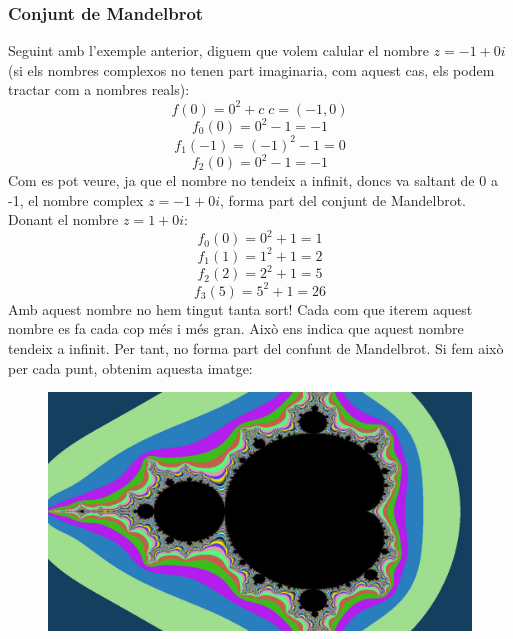 \subsubsection{Conjunt de Mandelbrot}
Seguint amb l'exemple anterior, diguem que volem calular el nombre $z = -1 + 0i$ (si els nombres complexos no tenen part imaginaria, com aquest cas, els podem tractar com a nombres reals):
\[f(0) = 0^2 + c \; c = (-1, 0)\]
\[f_0(0) = 0^2 - 1 = -1\]
\[f_1(-1) = (-1)^2 -1 = 0\]
\[f_2(0) = 0^2 - 1 = -1\]
Com es pot veure, ja que el nombre no tendeix a infinit, doncs va saltant de 0 a -1, el nombre complex $z = -1 + 0i$, forma part del conjunt de Mandelbrot. Donant el nombre $z = 1 + 0i$:
\[f_0(0) = 0^2 + 1 = 1\]
\[f_1(1) = 1^2 + 1 = 2\]
\[f_2(2) = 2^2 + 1 = 5\]
\[f_3(5) = 5^2 + 1 = 26\]
Amb aquest nombre no hem tingut tanta sort! Cada com que iterem aquest nombre es fa cada cop més i més gran. Això ens indica que aquest nombre tendeix a infinit. Per tant, no forma part del confunt de Mandelbrot. Si fem això per cada punt, obtenim aquesta imatge:

\begin{figure}[h!]
    \centering
    \includegraphics[width=.65\linewidth]{imatges/Captured_On_Sat_Aug__7_16-04-10_2021-.jpg}
    \label{fig:mandelbrot_example}
\end{figure}

